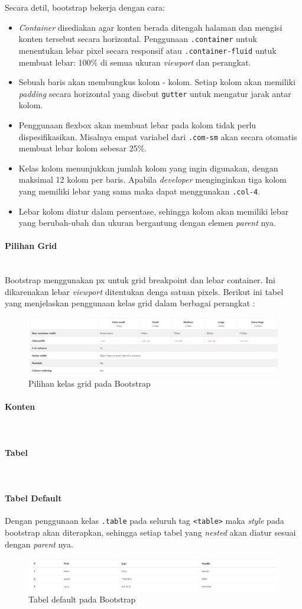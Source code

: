 \documentclass[a4paper,twoside]{article}
\newcommand{\myparagraph}[1]{\paragraph{#1}\mbox{}\\}
\begin{document}
\begin{enumerate}
		Secara detil, bootstrap bekerja dengan cara:
		\begin{itemize}
			\item \textit{Container} disediakan agar konten berada ditengah halaman dan mengisi konten tersebut secara horizontal. Penggunaan \verb|.container| untuk menentukan lebar pixel secara responsif atau \verb|.container-fluid| untuk membuat lebar: 100\%  di semua ukuran \textit{viewport} dan perangkat.
			\item Sebuah baris akan membungkus kolom - kolom. Setiap kolom akan memiliki \textit{padding} secara horizontal yang disebut \verb|gutter| untuk mengatur jarak antar kolom.
			\item Penggunaan flexbox akan membuat lebar pada kolom tidak perlu dispesifikasikan. Misalnya empat variabel dari \verb|.com-sm| akan secara otomatis membuat lebar kolom sebesar 25\%.
			\item Kelas kolom menunjukkan jumlah kolom yang ingin digunakan, dengan maksimal 12 kolom per baris. Apabila \textit{developer} menginginkan tiga kolom yang memiliki lebar yang sama maka dapat menggunakan \colorbox{mygray}{\texttt{.col-4}}.
			\item Lebar kolom diatur dalam persentase, sehingga kolom akan memiliki lebar yang berubah-ubah dan ukuran bergantung dengan elemen \textit{parent} nya.
		\end{itemize}
		\myparagraph{Pilihan Grid}
		Bootstrap menggunakan px untuk grid breakpoint dan lebar container. Ini dikarenakan lebar \textit{viewport} ditentukan denga satuan pixels.
		Berikut ini tabel yang menjelaskan penggunaan kelas grid dalam berbagai perangkat :
		\begin{figure} [H]
			\centering  
			\includegraphics[scale=0.7]{gridoption_bootstrap.png}  
			\caption{Pilihan kelas grid pada Bootstrap} 
		\end{figure}
		
		\myparagraph{Konten}
		\myparagraph{Tabel}
		\paragraph{Tabel Default}
		Dengan penggunaan kelas \verb|.table| pada seluruh tag \colorbox{mygray}{\texttt{<table>}} maka \textit{style} pada bootstrap akan diterapkan, sehingga setiap tabel yang \textit{nested} akan diatur sesuai dengan \textit{parent} nya.
		\begin{figure} [H]
			\centering  
			\includegraphics[scale=0.7]{tablebasic_bootstrap.png}  
			\caption{Tabel default pada Bootstrap} 
		\end{figure}
		

\end{enumerate}
\end{document}
